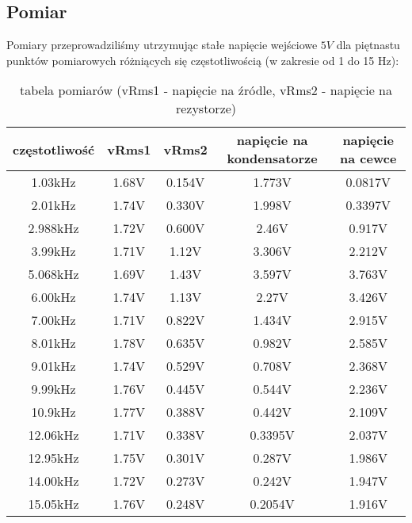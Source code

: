 \documentclass[polish,a4paper]{article}
\begin{document}
\subsection{Pomiar}
Pomiary przeprowadziliśmy utrzymując stałe napięcie wejściowe $5V$ dla piętnastu punktów pomiarowych różniących się częstotliwością (w zakresie od 1 do 15 Hz):
\newline
\begin{table}[H]
\centering
\begin{tabular}{|c|c|c|c|c|}
\hline
częstotliwość & vRms1 & vRms2 & napięcie\hspace{0.1cm} na\hspace{0.1cm} kondensatorze\hspace{0.1cm}& napięcie\hspace{0.1cm} na\hspace{0.1cm} cewce\hspace{0.1cm}\\
\hline 
1.03kHz & 1.68V & 0.154V & 1.773V & 0.0817V\\
\hline
2.01kHz & 1.74V & 0.330V & 1.998V & 0.3397V\\
\hline
2.988kHz & 1.72V & 0.600V & 2.46V & 0.917V\\
\hline
3.99kHz & 1.71V & 1.12V & 3.306V & 2.212V\\
\hline
5.068kHz & 1.69V & 1.43V & 3.597V & 3.763V\\
\hline
6.00kHz & 1.74V & 1.13V & 2.27V & 3.426V\\
\hline
7.00kHz & 1.71V & 0.822V & 1.434V & 2.915V\\
\hline
8.01kHz & 1.78V & 0.635V & 0.982V & 2.585V\\
\hline
9.01kHz & 1.74V & 0.529V & 0.708V & 2.368V\\
\hline
9.99kHz & 1.76V & 0.445V & 0.544V & 2.236V\\
\hline
10.9kHz & 1.77V & 0.388V & 0.442V & 2.109V\\
\hline
12.06kHz & 1.71V & 0.338V & 0.3395V & 2.037V\\
\hline
12.95kHz & 1.75V & 0.301V & 0.287V & 1.986V\\
\hline
14.00kHz & 1.72V & 0.273V & 0.242V & 1.947V\\
\hline
15.05kHz & 1.76V & 0.248V & 0.2054V & 1.916V\\
\hline
\end{tabular}
\caption{tabela pomiarów (vRms1 - napięcie na źródle, vRms2 - napięcie na rezystorze)}
\end{table}
\end{document}
